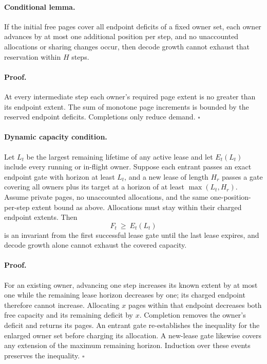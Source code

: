 \documentclass[11pt]{article}
\begin{document}
\paragraph{Conditional lemma.}
If the initial free pages cover all endpoint deficits of a fixed owner set,
each owner advances by at most one additional position per step, and no
unaccounted allocations or sharing changes occur, then decode growth cannot
exhaust that reservation within $H$ steps.
\paragraph{Proof.}
At every intermediate step each owner's required page extent is no greater
than its endpoint extent. The sum of monotone page increments is bounded by
the reserved endpoint deficits. Completions only reduce demand. \hfill$\square$

\paragraph{Dynamic capacity condition.}
Let $L_t$ be the largest remaining lifetime of any active lease and let
$E_t(L_t)$ include every running or in-flight owner. Suppose each entrant
passes an exact endpoint gate with horizon at least $L_t$, and a new lease
of length $H_r$ passes a gate covering all owners plus its target at a
horizon of at least $\max(L_t,H_r)$. Assume private pages, no unaccounted
allocations, and the same one-position-per-step extent bound as above.
Allocations must stay within their charged endpoint extents. Then
\[
F_t\ \ge\ E_t(L_t)
\]
is an invariant from the first successful lease gate until the last lease
expires, and decode growth alone cannot exhaust the covered capacity.

\paragraph{Proof.}
For an existing owner, advancing one step increases its known extent by
at most one while the remaining lease horizon decreases by one; its
charged endpoint therefore cannot increase. Allocating $x$ pages within
that endpoint decreases both free capacity and its remaining deficit by
$x$. Completion removes the owner's deficit and returns its pages.
An entrant gate re-establishes the inequality for the enlarged owner set
before charging its allocation. A new-lease gate likewise covers any
extension of the maximum remaining horizon. Induction over these events
preserves the inequality. \hfill$\square$
\end{document}
